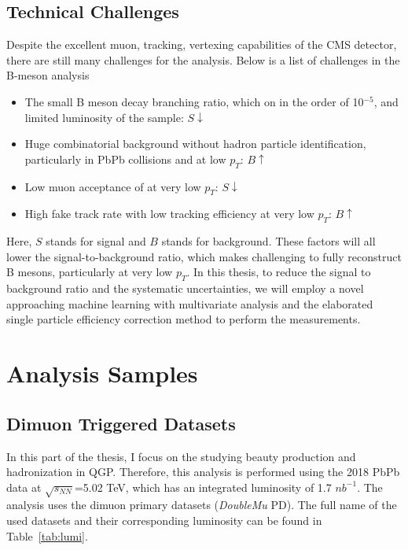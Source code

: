 \subsection{Technical Challenges}

Despite the excellent muon, tracking, vertexing capabilities of the CMS detector, there are still many challenges for the analysis. Below is a list of challenges in the B-meson analysis 

\begin{itemize}
\item The small B meson decay branching ratio, which on in the order of 10$^{-5}$, and limited luminosity of the sample: $S \downarrow$ 
\item Huge combinatorial background without hadron particle identification, particularly in PbPb collisions and at low $p_T$:  $B \uparrow$ 
\item Low muon acceptance of at very low $p_T$: $S \downarrow$ 
\item High fake track rate with low tracking efficiency at very low $p_T$: $B \uparrow$ 
\end{itemize}

Here, $S$ stands for signal and $B$ stands for background. These factors will all lower the signal-to-background ratio, which makes challenging to fully reconstruct B mesons, particularly at very low $p_T$. In this thesis, to reduce the signal to background ratio and the systematic uncertainties, we will employ a novel approaching machine learning with multivariate analysis and the elaborated single particle efficiency correction method to perform the measurements.


\section{Analysis Samples}


\subsection{Dimuon Triggered Datasets}

In this part of the thesis, I focus on the studying beauty production and hadronization in QGP. Therefore, this analysis is performed using the 2018 PbPb data at $\sqrt{s_{NN}}$=5.02 TeV, which has an integrated luminosity of 1.7 $nb^{-1}$. 
The analysis uses the dimuon primary datasets (\textit{DoubleMu} PD). The full name of the used datasets and their corresponding luminosity can be found in Table~\ref{tab:lumi}.

